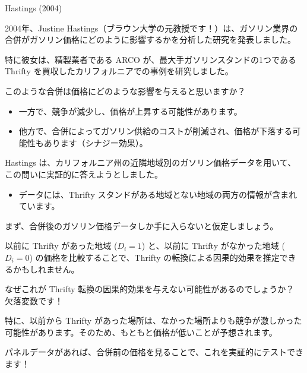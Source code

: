 \documentclass[11pt,handout]{beamer}
\newenvironment{wideitemize}{\itemize\addtolength{\itemsep}{10pt}}{\enditemize}
\begin{document}
\begin{frame}{Hastings (2004)}
\begin{wideitemize}
	\item
	2004年、Justine Hastings（ブラウン大学の元教授です！）は、ガソリン業界の合併がガソリン価格にどのように影響するかを分析した研究を発表しました。
	
	\pause
	\item
	特に彼女は、精製業者である ARCO が、最大手ガソリンスタンドの1つである Thrifty を買収したカリフォルニアでの事例を研究しました。
	
	\pause
	\item
	このような合併は価格にどのような影響を与えると思いますか？ 
	\pause
		\begin{itemize}
			\item 
			一方で、競争が減少し、価格が上昇する可能性があります。
			\item
			他方で、合併によってガソリン供給のコストが削減され、価格が下落する可能性もあります（シナジー効果）。
		\end{itemize}

	
	\pause
	\item
	Hastings は、カリフォルニア州の近隣地域別のガソリン価格データを用いて、この問いに実証的に答えようとしました。
		\begin{itemize}
			\item
			データには、Thrifty スタンドがある地域とない地域の両方の情報が含まれています。
		\end{itemize}	
	 
\end{wideitemize}
	
\end{frame}
	
	
\begin{frame}
	\begin{wideitemize}
		\item 
		まず、合併後のガソリン価格データしか手に入らないと仮定しましょう。
		
		\item
		以前に Thrifty があった地域 ($D_i = 1$) と、以前に Thrifty がなかった地域 ($D_i=0$) の価格を比較することで、Thrifty の転換による因果的効果を推定できるかもしれません。
		
		\pause
		\item
		なぜこれが Thrifty 転換の因果的効果を与えない可能性があるのでしょうか？ \pause 欠落変数です！
		
		\pause
		\item
		特に、以前から Thrifty があった場所は、なかった場所よりも競争が激しかった可能性があります。そのため、もともと価格が低いことが予想されます。
		
		\pause
		\item
		パネルデータがあれば、合併前の価格を見ることで、これを実証的にテストできます！
	\end{wideitemize}
\end{frame}	
\end{document}

